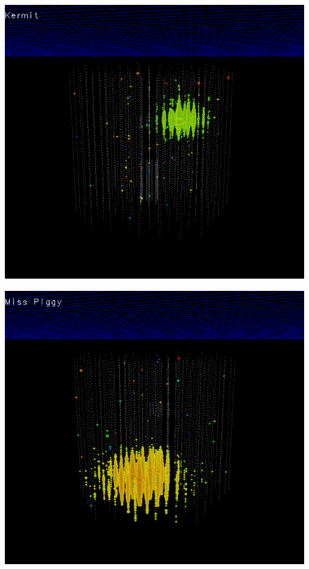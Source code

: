 \Tr
{}%
\begin{center}
\includegraphics[keepaspectratio,width=13cm]{kermit}
\end{center}

\newpage

\begin{center}
\includegraphics[keepaspectratio,width=13cm]{miss-piggy}
\end{center}

